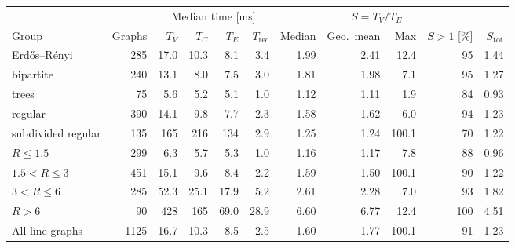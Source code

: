 \begin{tabular}{lrrrrrrrrrr}
\toprule
 & & \multicolumn{4}{c}{Median time [ms]} & \multicolumn{4}{c}{$S=T_V/T_E$} & \\
\cmidrule(lr){3-6}\cmidrule(lr){7-10}
Group & Graphs & $T_V$ & $T_C$ & $T_E$ & $T_{\mathrm{rec}}$ & Median & Geo.\ mean & Max & $S>1$ [\%] & $S_{\mathrm{tot}}$\\
\midrule
Erd\H{o}s--R\'enyi & 285 & 17.0 & 10.3 & 8.1 & 3.4 & 1.99 & 2.41 & 12.4 & 95 & 1.44\\
bipartite & 240 & 13.1 & 8.0 & 7.5 & 3.0 & 1.81 & 1.98 & 7.1 & 95 & 1.27\\
trees & 75 & 5.6 & 5.2 & 5.1 & 1.0 & 1.12 & 1.11 & 1.9 & 84 & 0.93\\
regular & 390 & 14.1 & 9.8 & 7.7 & 2.3 & 1.58 & 1.62 & 6.0 & 94 & 1.23\\
subdivided regular & 135 & 165 & 216 & 134 & 2.9 & 1.25 & 1.24 & 100.1 & 70 & 1.22\\
\midrule
$R\le 1.5$ & 299 & 6.3 & 5.7 & 5.3 & 1.0 & 1.16 & 1.17 & 7.8 & 88 & 0.96\\
$1.5<R\le 3$ & 451 & 15.1 & 9.6 & 8.4 & 2.2 & 1.59 & 1.50 & 100.1 & 90 & 1.22\\
$3<R\le 6$ & 285 & 52.3 & 25.1 & 17.9 & 5.2 & 2.61 & 2.28 & 7.0 & 93 & 1.82\\
$R>6$ & 90 & 428 & 165 & 69.0 & 28.9 & 6.60 & 6.77 & 12.4 & 100 & 4.51\\
\midrule
All line graphs & 1125 & 16.7 & 10.3 & 8.5 & 2.5 & 1.60 & 1.77 & 100.1 & 91 & 1.23\\
\bottomrule
\end{tabular}
